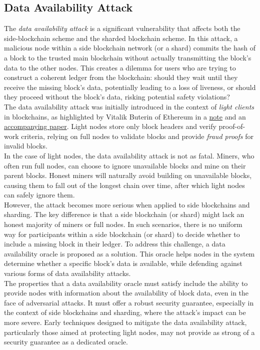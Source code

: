 \documentclass{report}
\begin{document}
\subsection{Data Availability Attack}
The \textit{data availability attack} is a significant vulnerability that affects both the side-blockchain scheme and the sharded blockchain scheme. In this attack, a malicious node within a side blockchain network (or a shard) commits the hash of a block to the trusted main blockchain without actually transmitting the block's data to the other nodes. This creates a dilemma for users who are trying to construct a coherent ledger from the blockchain: should they wait until they receive the missing block's data, potentially leading to a loss of liveness, or should they proceed without the block's data, risking potential safety violations?\\
The data availability attack was initially introduced in the context of \textit{light clients} in blockchains, as highlighted by Vitalik Buterin of Ethereum in a \href{https://github.com/ethereum/research/wiki/A-note-on-data-availability-and-erasure-coding}{note} and an \href{https://arxiv.org/abs/1809.09044}{accompanying paper}. Light nodes store only block headers and verify proof-of-work criteria, relying on full nodes to validate blocks and provide \textit{fraud proofs} for invalid blocks.\\
In the case of light nodes, the data availability attack is not as fatal. Miners, who often run full nodes, can choose to ignore unavailable blocks and mine on their parent blocks. Honest miners will naturally avoid building on unavailable blocks, causing them to fall out of the longest chain over time, after which light nodes can safely ignore them.\\
However, the attack becomes more serious when applied to side blockchains and sharding. The key difference is that a side blockchain (or shard) might lack an honest majority of miners or full nodes. In such scenarios, there is no uniform way for participants within a side blockchain (or shard) to decide whether to include a missing block in their ledger. To address this challenge, a data availability oracle is proposed as a solution. This oracle helps nodes in the system determine whether a specific block's data is available, while defending against various forms of data availability attacks.\\
The properties that a data availability oracle must satisfy include the ability to provide nodes with information about the availability of block data, even in the face of adversarial attacks. It must offer a robust security guarantee, especially in the context of side blockchains and sharding, where the attack's impact can be more severe. Early techniques designed to mitigate the data availability attack, particularly those aimed at protecting light nodes, \cite{reference1, reference4} may not provide as strong of a security guarantee as a dedicated oracle.\\
\end{document}
